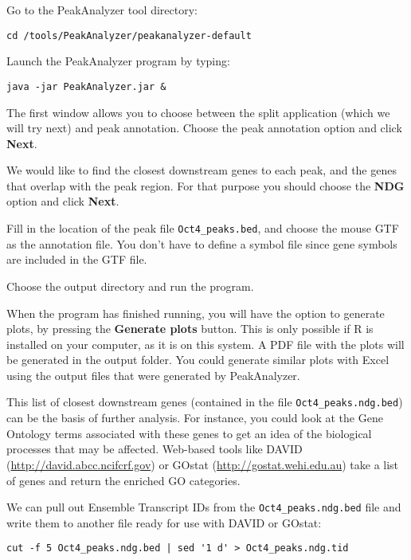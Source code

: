 \begin{steps}
Go to the PeakAnalyzer tool directory:
\begin{lstlisting}
cd /tools/PeakAnalyzer/peakanalyzer-default
\end{lstlisting}
Launch the PeakAnalyzer program by typing:
\begin{lstlisting}
java -jar PeakAnalyzer.jar &
\end{lstlisting}

The first window allows you to choose between the split application (which we
will try next) and peak annotation. Choose the peak annotation option and click
\textbf{Next}.

We would like to find the closest downstream genes to each peak, and the genes
that overlap with the peak region. For that purpose you should choose the
\textbf{NDG} option and click \textbf{Next}.

Fill in the location of the peak file \texttt{Oct4\_peaks.bed}, and choose the mouse GTF
as the annotation file. You don't have to define a symbol file since gene
symbols are included in the GTF file.

Choose the output directory and run the program.
\end{steps}

\begin{information}
When the program has finished running, you will have the option to generate
plots, by pressing the \textbf{Generate plots} button. This is only possible if R is
installed on your computer, as it is on this system. A PDF file with the plots will be generated in
the output folder. You could generate similar plots with Excel using the output files that
were generated by PeakAnalyzer. 
\end{information}

\begin{note}
This list of closest downstream genes (contained in the file
\texttt{Oct4\_peaks.ndg.bed}) can be the basis of further analysis. For instance,
you could look at the Gene Ontology terms associated with these genes to get an
idea of the biological processes that may be affected. Web-based tools like
DAVID (\url{http://david.abcc.ncifcrf.gov}) or GOstat
(\url{http://gostat.wehi.edu.au}) take a list of genes and return the enriched
GO categories.
\end{note}

\begin{bonus}
We can pull out Ensemble Transcript IDs from the \texttt{Oct4\_peaks.ndg.bed}
file and write them to another file ready for use with DAVID or GOstat:
\begin{lstlisting}
cut -f 5 Oct4_peaks.ndg.bed | sed '1 d' > Oct4_peaks.ndg.tid
\end{lstlisting}
\end{bonus}

